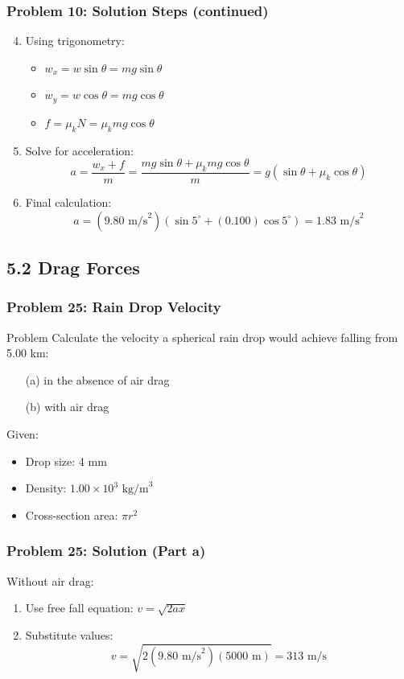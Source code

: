 \documentclass{beamer}
\begin{document}
\begin{frame}
\frametitle{Problem 10: Solution Steps (continued)}
\begin{enumerate}\setcounter{enumi}{3}
\item Using trigonometry:
    \begin{itemize}
    \item $w_x = w \sin \theta = mg \sin \theta$
    \item $w_y = w \cos \theta = mg \cos \theta$
    \item $f = \mu_k N = \mu_k mg \cos \theta$
    \end{itemize}
\item Solve for acceleration:
    \[a = \frac{w_x + f}{m} = \frac{mg \sin \theta + \mu_k mg \cos \theta}{m} = g(\sin \theta + \mu_k \cos \theta)\]
\item Final calculation:
    \[a = (9.80 \text{ m/s}^2)(\sin 5^\circ + (0.100)\cos 5^\circ) = 1.83 \text{ m/s}^2\]
\end{enumerate}
\end{frame}

\subsection{5.2 Drag Forces}

\begin{frame}
\frametitle{Problem 25: Rain Drop Velocity}
\begin{block}{Problem}
Calculate the velocity a spherical rain drop would achieve falling from 5.00 km:
\begin{itemize}
\item[(a)] in the absence of air drag
\item[(b)] with air drag
\end{itemize}
Given:
\begin{itemize}
\item Drop size: 4 mm
\item Density: $1.00 \times 10^3 \text{ kg/m}^3$
\item Cross-section area: $\pi r^2$
\end{itemize}
\end{block}
\end{frame}

\begin{frame}
\frametitle{Problem 25: Solution (Part a)}
Without air drag:
\begin{enumerate}
\item Use free fall equation: $v = \sqrt{2ax}$
\item Substitute values:
    \[v = \sqrt{2(9.80 \text{ m/s}^2)(5000 \text{ m})} = 313 \text{ m/s}\]
\end{enumerate}
\end{frame}
\end{document}
